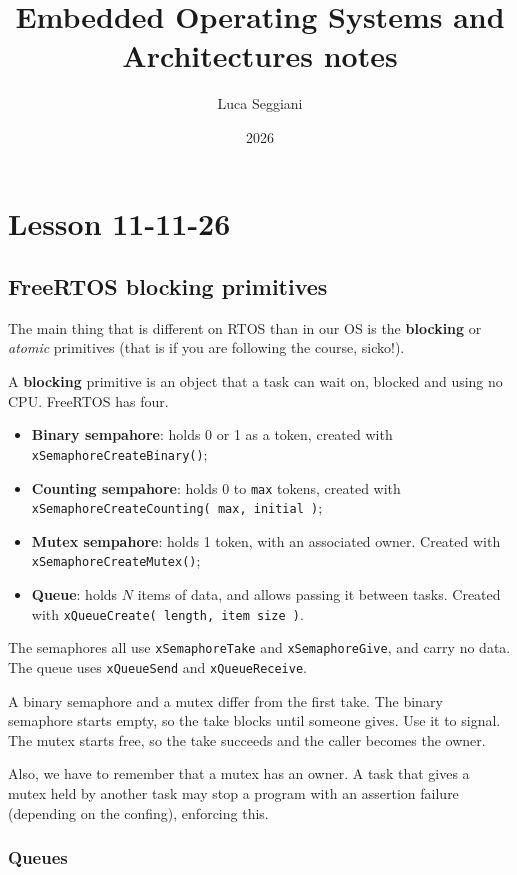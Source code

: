 \documentclass[a4paper,11pt]{article}
\title{Embedded Operating Systems and Architectures notes}
\author{Luca Seggiani}
\date{2026}
\begin{document}
\section{Lesson 11-11-26}

\thispagestyle{empty}
\pagestyle{fancy}


\subsection{FreeRTOS blocking primitives}

The main thing that is different on RTOS than in our OS is the \textbf{blocking} or \textit{atomic} primitives (that is if you are following the course, sicko!).

A \textbf{blocking} primitive is an object that a task can wait on, blocked and using no CPU. FreeRTOS has four.

\begin{itemize}
	\item \textbf{Binary sempahore}: holds 0 or 1 as a token, created with \texttt{xSemaphoreCreateBinary()};
	\item \textbf{Counting sempahore}: holds 0 to \texttt{max} tokens, created with \texttt{xSemaphoreCreateCounting( max, initial )};
	\item \textbf{Mutex sempahore}: holds 1 token, with an associated owner. Created with \texttt{xSemaphoreCreateMutex()};
	\item \textbf{Queue}: holds $N$ items of data, and allows passing it between tasks. Created with \texttt{xQueueCreate( length, item size )}.
\end{itemize}

The semaphores all use \texttt{xSemaphoreTake} and \texttt{xSemaphoreGive}, and carry no data. The queue uses \texttt{xQueueSend} and \texttt{xQueueReceive}.

A binary semaphore and a mutex differ from the first take. The binary semaphore starts empty, so the take blocks
until someone gives. Use it to signal. The mutex starts free, so the take succeeds and the caller becomes the owner.

Also, we have to remember that a mutex has an owner. A task that gives a mutex held by another task may stop a program with an assertion failure (depending on the confing), enforcing this.

\subsubsection{Queues}
\end{document}
